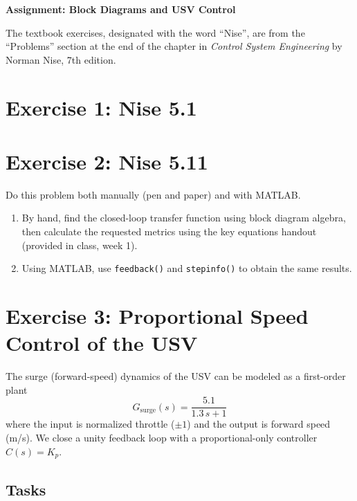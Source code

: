 \documentclass[11pt]{article}
\begin{document}
\begin{center}
  \Large{\bf{Assignment: Block Diagrams and USV Control}}
\end{center}

The textbook exercises, designated with the word ``Nise'', are from the
``Problems'' section at the end of the chapter in \emph{Control System
Engineering} by Norman Nise, 7th edition.

\section*{Exercise 1: Nise 5.1}

\section*{Exercise 2: Nise 5.11}

Do this problem both manually (pen and paper) and with MATLAB.

\begin{enumerate}
\item By hand, find the closed-loop transfer function using block diagram
  algebra, then calculate the requested metrics using the key equations handout (provided in class, week 1).
\item Using MATLAB, use \texttt{feedback()} and \texttt{stepinfo()} to obtain
  the same results.
\end{enumerate}

\section*{Exercise 3: Proportional Speed Control of the USV}

The surge (forward-speed) dynamics of the USV can be modeled as a first-order
plant
\[
  G_{\mathrm{surge}}(s) = \frac{5.1}{1.3\,s + 1}
\]
where the input is normalized throttle ($\pm 1$) and the output is forward
speed (m/s).
We close a unity feedback loop with a proportional-only controller $C(s) = K_p$.

\subsection*{Tasks}
\end{document}
